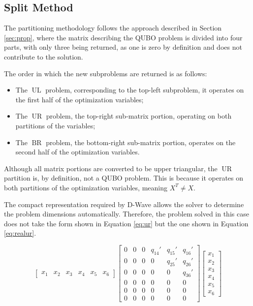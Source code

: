 \subsection{Split Method}\label{sec:split}

The partitioning methodology follows the approach described in Section \ref{sec:prop}, where the matrix describing the QUBO problem is divided into four parts, with only three being returned, as one is zero by definition and does not contribute to the solution.

The order in which the new subproblems are returned is as follows: 
\begin{itemize} 
	\item The $\operatorname{UL}$ problem, corresponding to the top-left subproblem, it operates on the first half of the optimization variables; 
	\item The $\operatorname{UR}$ problem, the top-right sub-matrix portion, operating on both partitions of the variables; 
	\item The $\operatorname{BR}$ problem, the bottom-right sub-matrix portion, operates on the second half of the optimization variables. 
\end{itemize}

Although all matrix portions are converted to be upper triangular, the $\operatorname{UR}$ partition is, by definition, not a QUBO problem. 
This is because it operates on both partitions of the optimization variables, meaning $X^T \neq X$.

The compact representation required by D-Wave allows the solver to determine the problem dimensions automatically. 
Therefore, the problem solved in this case does not take the form shown in Equation \ref{eq:ur} but the one shown in Equation \ref{eq:realur}.

\begin{equation}
    \begin{bmatrix}
        x_1 & x_2 & x_3 & x_4 & x_5 & x_6
    \end{bmatrix}
    \begin{bmatrix}
        0 & 0 & 0 & q_{14}' & q_{15}' & q_{16}' \\
        0 & 0 & 0 & 0 & q_{25}' & q_{26}' \\
        0 & 0 & 0 & 0 & 0 & q_{36}' \\
        0 & 0 & 0 & 0 & 0 & 0 \\
        0 & 0 & 0 & 0 & 0 & 0 \\
        0 & 0 & 0 & 0 & 0 & 0
    \end{bmatrix}
    \begin{bmatrix}
        x_1 \\
        x_2 \\
        x_3 \\
        x_4 \\
        x_5 \\
        x_6
    \end{bmatrix}
    \label{eq:realur}
\end{equation}


